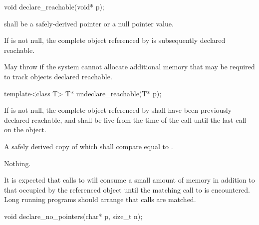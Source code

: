 %
\begin{itemdecl}
void declare_reachable(void* p);
\end{itemdecl}

\begin{itemdescr}
\pnum
\requires {} shall be a safely-derived
pointer or a null pointer value.

\pnum
\effects
If  is not null, the complete object referenced by 
is subsequently declared reachable.

\pnum
\throws
May throw  if the system cannot allocate
additional memory that may be required to track objects declared reachable.
\end{itemdescr}

%
\begin{itemdecl}
template<class T> T* undeclare_reachable(T* p);
\end{itemdecl}

\begin{itemdescr}
\pnum
\requires If  is not null, the complete object referenced by 
shall have been previously declared reachable, and shall be
live from the time of the call until the last
 call on the object.

\pnum
\returns
A safely derived copy of  which shall compare equal to .

\pnum
\throws
Nothing.

\pnum
\begin{note}
It is expected that calls to  will consume
a small amount of memory in addition to that occupied by the referenced object until the
matching call to  is encountered. Long running programs
should arrange that calls are matched.
\end{note}
\end{itemdescr}

%
\begin{itemdecl}
void declare_no_pointers(char* p, size_t n);
\end{itemdecl}

